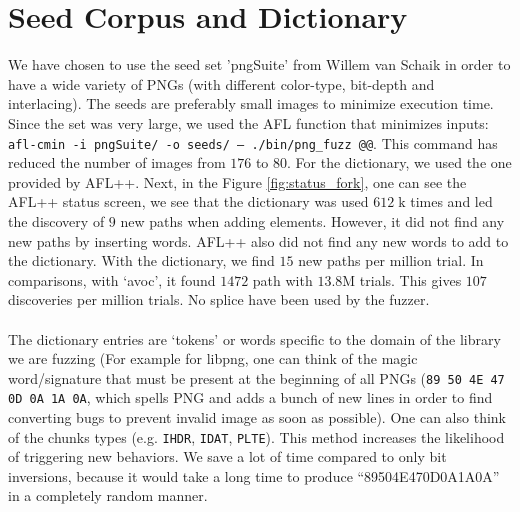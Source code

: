 \section{Seed Corpus and Dictionary}
We have chosen to use the seed set 'pngSuite' from Willem van Schaik \cite{vanschaikPngSuiteOfficialSet} in order to have a wide variety of PNGs (with different color-type, bit-depth and interlacing).
The seeds are preferably small images to minimize execution time. Since the set was very large, we used the  AFL function that minimizes inputs: \texttt{afl-cmin -i pngSuite/ -o seeds/ -- ./bin/png\_fuzz @@}. This command has reduced the number of images from $176$ to $80$.
For the dictionary, we used the one provided by AFL++.
Next, in the Figure \ref{fig:status_fork}, one can see the AFL++ status screen, we see that the dictionary was used $612\;\mathrm{k}$ times and led the discovery of $9$ new paths when adding elements. However, it did not find any new paths by inserting words. AFL++ also did not find any new words to add to the dictionary. With the dictionary, we find $15$ new paths per million trial. In comparisons, with ‘avoc’, it found $1472$ path with $13.8\mathrm{M}$ trials. This gives $107$ discoveries per million trials. No splice have been used by the fuzzer.\\\\
The dictionary entries are ‘tokens’ or words specific to the domain of the library we are fuzzing (For example for libpng, one can think of the magic word/signature that must be present at the beginning of all PNGs (\texttt{89 50 4E 47 0D 0A 1A 0A}, which spells PNG and adds a bunch of new lines in order to find converting bugs to prevent invalid image as soon as possible). One can also think of the chunks types (e.g. \texttt{IHDR}, \texttt{IDAT}, \texttt{PLTE}). This method increases the likelihood of triggering new behaviors. We save a lot of time compared to only bit inversions, because it would take a long time to produce “89504E470D0A1A0A” in a completely random manner.